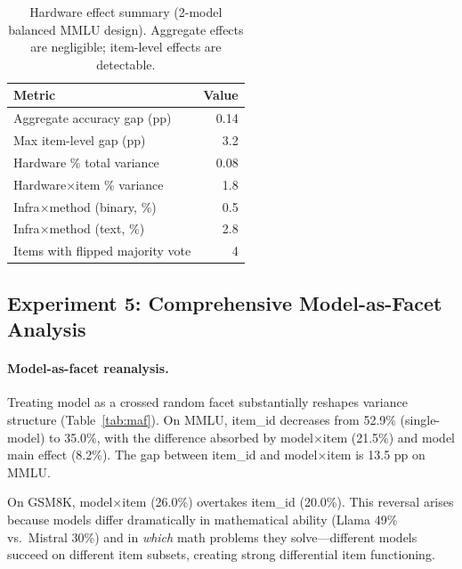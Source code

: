 \documentclass[letterpaper,11pt]{article}
\begin{document}
\begin{table}[t]
\centering
\caption{Hardware effect summary (2-model balanced MMLU design). Aggregate effects are negligible; item-level effects are detectable.}
\label{tab:hardware}
\small
\begin{tabular}{@{}l r@{}}
\toprule
Metric & Value \\
\midrule
Aggregate accuracy gap (pp)       & 0.14 \\
Max item-level gap (pp)           & 3.2  \\
Hardware \% total variance        & 0.08 \\
Hardware$\times$item \% variance  & 1.8  \\
Infra$\times$method (binary, \%)  & 0.5  \\
Infra$\times$method (text, \%)    & 2.8  \\
Items with flipped majority vote  & 4    \\
\bottomrule
\end{tabular}
\end{table}

\subsection{Experiment 5: Comprehensive Model-as-Facet Analysis}
\label{sec:exp4}

\paragraph{Model-as-facet reanalysis.}
Treating model as a crossed random facet substantially reshapes variance structure (Table~\ref{tab:maf}).
On MMLU, item\_id decreases from 52.9\% (single-model) to 35.0\%, with the difference absorbed by model$\times$item (21.5\%) and model main effect (8.2\%).
The gap between item\_id and model$\times$item is 13.5 pp on MMLU.

On GSM8K, model$\times$item (26.0\%) overtakes item\_id (20.0\%).
This reversal arises because models differ dramatically in mathematical ability (Llama 49\% vs.\ Mistral 30\%) and in \emph{which} math problems they solve---different models succeed on different item subsets, creating strong differential item functioning.
\end{document}
